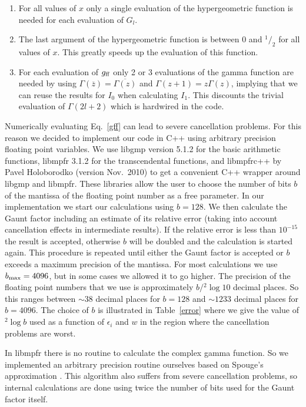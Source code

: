 \documentclass[useAMS,usenatbib]{mn2e}
\def\rfrac#1#2{{}^{#1}\!/_{#2}}
\begin{document}
\begin{enumerate}
\item For all values of $x$ only a single evaluation of the hypergeometric
  function is needed for each evaluation of $G_l$.
\item The last argument of the hypergeometric function is between 0 and
  $\rfrac{1}{2}$ for all values of $x$. This greatly speeds up the evaluation
  of this function.
\item For each evaluation of $g_{\rm ff}$ only 2 or 3 evaluations of the gamma
  function are needed by using $\Gamma(\overline{z}) = \overline{\Gamma(z)}$
  and $\Gamma(z+1) = z\Gamma(z)$, implying that we can reuse the results for
  $I_0$ when calculating $I_1$. This discounts the trivial evaluation of
  $\Gamma(2l+2)$ which is hardwired in the code.
\end{enumerate}

Numerically evaluating Eq.~\ref{gff} can lead to severe cancellation problems.
For this reason we decided to implement our code in C++ using arbitrary
precision floating point variables. We use libgmp version 5.1.2 for the basic
arithmetic functions, libmpfr 3.1.2 for the transcendental functions, and
libmpfrc++ by Pavel Holoborodko (version Nov.\ 2010) to get a convenient C++
wrapper around libgmp and libmpfr. These libraries allow the user to choose
the number of bits $b$ of the mantissa of the floating point number as a free
parameter. In our implementation we start our calculations using $b = 128$. We
then calculate the Gaunt factor including an estimate of its relative error
(taking into account cancellation effects in intermediate results). If the
relative error is less than $10^{-15}$ the result is accepted, otherwise $b$
will be doubled and the calculation is started again. This procedure is
repeated until either the Gaunt factor is accepted or $b$ exceeds a maximum
precision of the mantissa. For most calculations we use $b_{\rm max} = 4096$,
but in some cases we allowed it to go higher. The precision of the floating
point numbers that we use is approximately $b/{}^2\log10$ decimal places. So
this ranges between $\sim 38$ decimal places for $b=128$ and $\sim 1233$
decimal places for $b=4096$. The choice of $b$ is illustrated in
Table~\ref{error} where we give the value of ${}^2\log b$ used as a function
of $\epsilon_i$ and $w$ in the region where the cancellation problems are
worst.

In libmpfr there is no routine to calculate the complex gamma function. So we
implemented an arbitrary precision routine ourselves based on Spouge's
approximation \citep{sp94}. This algorithm also suffers from severe
cancellation problems, so internal calculations are done using twice the
number of bits used for the Gaunt factor itself.
\end{document}
